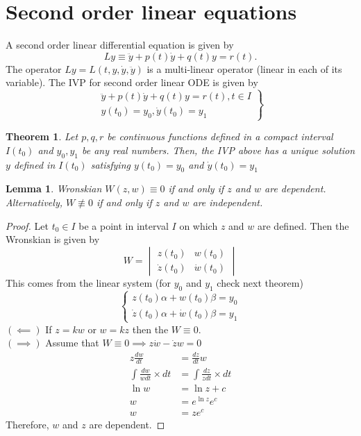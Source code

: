 \documentclass[12pt,reqno]{amsart}
\theoremstyle{plain}
\newtheorem{thm}{Theorem}
\newtheorem{lem}{Lemma}
\theoremstyle{definition}
\begin{document}
\section{Second order linear equations} 
A second order linear differential equation is given by 
$$ Ly \equiv \ddot{y} + p(t)\dot{y} + q(t)y = r(t). $$
The operator $ Ly = L(t, y, \dot{y}, \ddot{y})$ is a multi-linear operator (linear in each of its variable). The IVP for second order linear ODE is given by
$$
\left.
\begin{array}{l}
    \ddot{y} + p(t)\dot{y} + q(t)y = r(t), t\in I \\
    y(t_0) = y_0, \dot{y}(t_0) = y_1    
\end{array}
\right\}
$$
\begin{thm}
    Let $p,q,r$ be continuous functions defined in a compact interval $I(t_0)$ and $y_0, y_1$ be any real numbers. Then, the IVP above has a unique solution $y$ defined in $I(t_0)$ satisfying $y(t_0) = y_0$ and $\dot{y}(t_0) = y_1$
\end{thm}
\begin{lem}
    Wronskian $W(z,w) \equiv 0$ if and only if $z$ and $w$ are dependent. Alternatively, $W \not\equiv 0$ if and only if $z$ and $w$ are independent. 
\end{lem}
\begin{proof}
    Let $t_0 \in I$ be a point in interval $I$ on which $z$ and $w$ are defined. Then the Wronskian is given by
    $$  W = \begin{vmatrix}
        z(t_0) & w(t_0) \\
        \dot{z}(t_0) & \dot{w}(t_0) 
    \end{vmatrix}
    $$
    This comes from the linear system (for $y_0$ and $y_1$ check next theorem)
    $$ \left\{
        \begin{array}{l}
            z(t_0)\alpha + w(t_0) \beta = y_0 \\
            \dot{z}(t_0) \alpha + \dot{w}(t_0) \beta = y_1 
        \end{array}
        \right.
    $$
    $(\impliedby)$ If $z = kw$ or $w = kz$ then the $W \equiv 0$.\\
    $(\implies)$ Assume that $W \equiv 0 \implies z\dot{w} - \dot{z}w = 0$
    \begin{align*}
        z\frac{dw}{dt} &= \frac{dz}{dt}w \\
        \int \frac{dw}{wdt} \times dt &= \int \frac{dz}{zdt} \times dt \\
        \ln w &= \ln z + c\\
        w &= e^{\ln z}e^c\\
        w &= ze^c
    \end{align*} 
    Therefore, $w$ and $z$ are dependent.
\end{proof}
\end{document}
